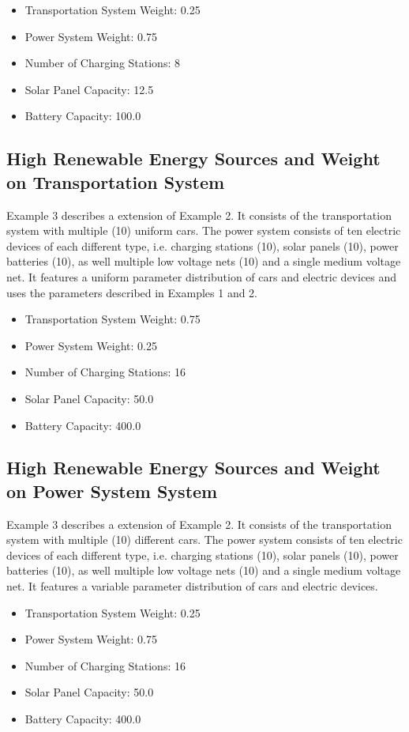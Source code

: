 \begin{itemize}  
	\item Transportation System Weight: 0.25
	\item Power System Weight: 0.75
	\item Number of Charging Stations: 8
	\item Solar Panel Capacity: 12.5
	\item Battery Capacity: 100.0
\end{itemize}

\subsection{High Renewable Energy Sources and Weight on Transportation System}
Example 3 describes a extension of Example 2. It consists of the transportation system with multiple (10) uniform cars.
The power system consists of ten electric devices of each different type, i.e. charging stations (10), solar panels (10), power batteries (10), as well multiple low voltage nets (10) and a single medium voltage net.
It features a uniform parameter distribution of cars and electric devices and uses the parameters described in Examples 1 and 2.

\begin{itemize}  
	\item Transportation System Weight: 0.75
	\item Power System Weight: 0.25
	\item Number of Charging Stations: 16
	\item Solar Panel Capacity: 50.0
	\item Battery Capacity: 400.0
\end{itemize}

\subsection{High Renewable Energy Sources and Weight on Power System System}
Example 3 describes a extension of Example 2. It consists of the transportation system with multiple (10) different cars.
The power system consists of ten electric devices of each different type, i.e. charging stations (10), solar panels (10), power batteries (10), as well multiple low voltage nets (10) and a single medium voltage net.
It features a variable parameter distribution of cars and electric devices.

\begin{itemize}  
	\item Transportation System Weight: 0.25
	\item Power System Weight: 0.75
	\item Number of Charging Stations: 16
	\item Solar Panel Capacity: 50.0
	\item Battery Capacity: 400.0
\end{itemize}

